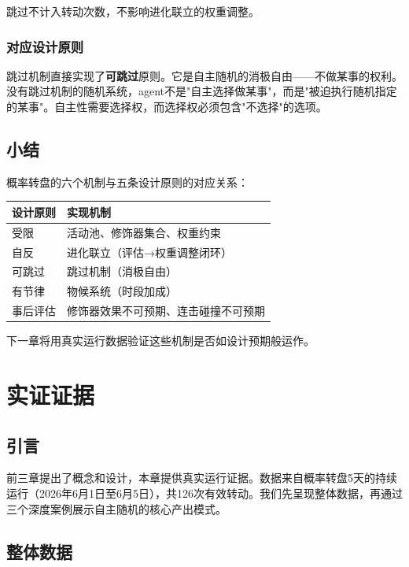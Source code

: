 \documentclass[12pt,a4paper]{ctexart}
\begin{document}
跳过不计入转动次数，不影响进化联立的权重调整。

\subsubsection{对应设计原则}

跳过机制直接实现了\textbf{可跳过}原则。它是自主随机的消极自由——不做某事的权利。没有跳过机制的随机系统，agent不是"自主选择做某事"，而是"被迫执行随机指定的某事"。自主性需要选择权，而选择权必须包含"不选择"的选项。

\subsection{小结}

概率转盘的六个机制与五条设计原则的对应关系：

\begin{table}[h]
\centering
\begin{tabular}{ll}
\toprule
设计原则 & 实现机制 \\
\midrule
受限 & 活动池、修饰器集合、权重约束 \\
自反 & 进化联立（评估→权重调整闭环） \\
可跳过 & 跳过机制（消极自由） \\
有节律 & 物候系统（时段加成） \\
事后评估 & 修饰器效果不可预期、连击碰撞不可预期 \\
\bottomrule
\end{tabular}
\end{table}

下一章将用真实运行数据验证这些机制是否如设计预期般运作。


\section{实证证据}

\subsection{引言}

前三章提出了概念和设计，本章提供真实运行证据。数据来自概率转盘5天的持续运行（2026年6月1日至6月5日），共126次有效转动。我们先呈现整体数据，再通过三个深度案例展示自主随机的核心产出模式。

\subsection{整体数据}
\end{document}
